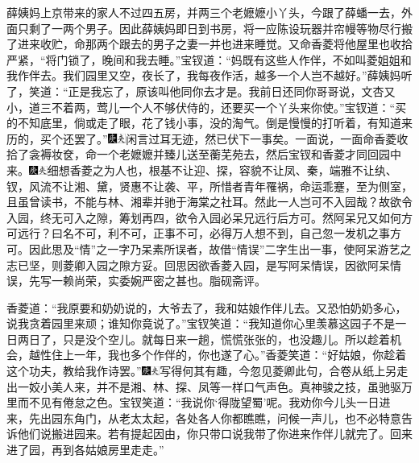 薛姨妈上京带来的家人不过四五房，并两三个老嬷嬷小丫头，今跟了薛蟠一去，外面只剩了一两个男子。因此薛姨妈即日到书房，将一应陈设玩器并帘幔等物尽行搬了进来收贮，命那两个跟去的男子之妻一并也进来睡觉。又命香菱将他屋里也收拾严紧，“将门锁了，晚间和我去睡。”宝钗道：“妈既有这些人作伴，不如叫菱姐姐和我作伴去。我们园里又空，夜长了，我每夜作活，越多一个人岂不越好。”薛姨妈听了，笑道：“正是我忘了，原该叫他同你去才是。我前日还同你哥哥说，文杏又小，道三不着两，莺儿一个人不够伏侍的，还要买一个丫头来你使。”宝钗道：“买的不知底里，倘或走了眼，花了钱小事，没的淘气。倒是慢慢的打听着，有知道来历的，买个还罢了。”{\includegraphics[width=3mm]{../Images/00004}\includegraphics[width=3mm]{../Images/00012}\footnotesize \kaishu 闲言过耳无迹，然已伏下一事矣。}一面说，一面命香菱收拾了衾褥妆奁，命一个老嬷嬷并臻儿送至蘅芜苑去，然后宝钗和香菱才同回园中来。{\includegraphics[width=3mm]{../Images/00004}\includegraphics[width=3mm]{../Images/00012}\footnotesize \kaishu 细想香菱之为人也，根基不让迎、探，容貌不让凤、秦，端雅不让纨、钗，风流不让湘、黛，贤惠不让袭、平，所惜者青年罹祸，命运乖蹇，至为侧室，且虽曾读书，不能与林、湘辈并驰于海棠之社耳。然此一人岂可不入园哉？故欲令入园，终无可入之隙，筹划再四，欲令入园必呆兄远行后方可。然阿呆兄又如何方可远行？曰名不可，利不可，正事不可，必得万人想不到，自己忽一发机之事方可。因此思及“情”之一字乃呆素所误者，故借“情误”二字生出一事，使阿呆游艺之志已坚，则菱卿入园之隙方妥。回思因欲香菱入园，是写阿呆情误，因欲阿呆情误，先写一赖尚荣，实委婉严密之甚也。脂砚斋评。}

香菱道：“我原要和奶奶说的，大爷去了，我和姑娘作伴儿去。又恐怕奶奶多心，说我贪着园里来顽；谁知你竟说了。”宝钗笑道：“我知道你心里羡慕这园子不是一日两日了，只是没个空儿。就每日来一趟，慌慌张张的，也没趣儿。所以趁着机会，越性住上一年，我也多个作伴的，你也遂了心。”香菱笑道：“好姑娘，你趁着这个功夫，教给我作诗罢。”{\includegraphics[width=3mm]{../Images/00004}\includegraphics[width=3mm]{../Images/00012}\footnotesize \kaishu 写得何其有趣，今忽见菱卿此句，合卷从纸上另走出一姣小美人来，并不是湘、林、探、凤等一样口气声色。真神骏之技，虽驰驱万里而不见有倦怠之色。}宝钗笑道：“我说你‘得陇望蜀’呢。我劝你今儿头一日进来，先出园东角门，从老太太起，各处各人你都瞧瞧，问候一声儿，也不必特意告诉他们说搬进园来。若有提起因由，你只带口说我带了你进来作伴儿就完了。回来进了园，再到各姑娘房里走走。”

